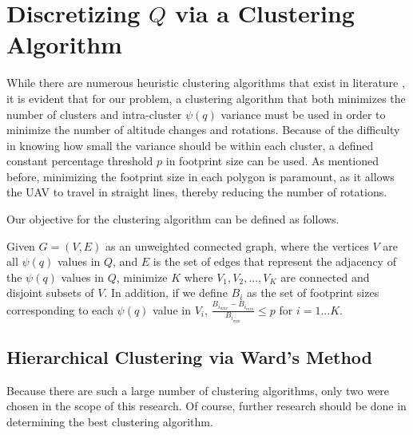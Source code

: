 \documentclass[conference]{IEEEtran}
\theoremstyle{plain}%
\begin{document}
\section{Discretizing $Q$ via a Clustering Algorithm} \label{clustering}
While there are numerous heuristic clustering algorithms that exist in literature \cite{xu2005survey}, it is evident that for our problem, a clustering algorithm that both minimizes the number of clusters and intra-cluster $\psi(q)$ variance must be used in order to minimize the number of altitude changes and rotations. Because of the difficulty in knowing how small the variance should be within each cluster, a defined constant percentage threshold $p$ in footprint size can be used. As mentioned before, minimizing the footprint size in each polygon is paramount, as it allows the UAV to travel in straight lines, thereby reducing the number of rotations.

Our objective for the clustering algorithm can be defined as follows.

Given $G=(V,E)$ as an unweighted connected graph, where the vertices $V$ are all $\psi(q)$ values in $Q$, and $E$ is the set of edges that represent the adjacency of the $\psi(q)$ values in $Q$, minimize $K$ where $V_1, V_2, ..., V_K$ are connected and disjoint subsets of $V$. In addition, if we define $B_i$ as the set of footprint sizes corresponding to each $\psi(q)$ value in $V_i$, $\frac{B_{i_{max}}-B_{i_{min}}}{B_{i_{min}}} \leq p$ for $i = 1...K$.

\subsection{Hierarchical Clustering via Ward's Method}
Because there are such a large number of clustering algorithms, only two were chosen in the scope of this research. Of course, further research should be done in determining the best clustering algorithm.
\end{document}

